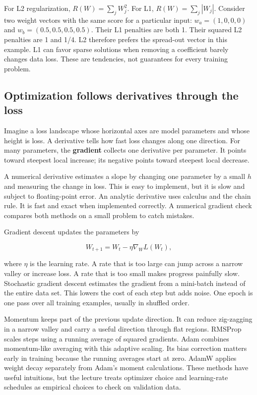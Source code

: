 For L2 regularization, \(R(W)=\sum_j W_j^2\). For L1, \(R(W)=\sum_j|W_j|\). Consider two weight vectors with the same score for a particular input: \(w_a=(1,0,0,0)\) and \(w_b=(0.5,0.5,0.5,0.5)\). Their L1 penalties are both 1. Their squared L2 penalties are 1 and 1/4. L2 therefore prefers the spread-out vector in this example. L1 can favor sparse solutions when removing a coefficient barely changes data loss. These are tendencies, not guarantees for every training problem.

\subsection{Optimization follows derivatives through the loss}\label{04-visual-computing-ii-ch031-optimization-follows-derivatives-through-the-loss}

Imagine a loss landscape whose horizontal axes are model parameters and whose height is loss. A derivative tells how fast loss changes along one direction. For many parameters, the \textbf{gradient} collects one derivative per parameter. It points toward steepest local increase; its negative points toward steepest local decrease.

A numerical derivative estimates a slope by changing one parameter by a small \(h\) and measuring the change in loss. This is easy to implement, but it is slow and subject to floating-point error. An analytic derivative uses calculus and the chain rule. It is fast and exact when implemented correctly. A numerical gradient check compares both methods on a small problem to catch mistakes.

Gradient descent updates the parameters by

\[W_{t+1}=W_t-\eta\nabla_W L(W_t),\]

where \(\eta\) is the learning rate. A rate that is too large can jump across a narrow valley or increase loss. A rate that is too small makes progress painfully slow. Stochastic gradient descent estimates the gradient from a mini-batch instead of the entire data set. This lowers the cost of each step but adds noise. One epoch is one pass over all training examples, usually in shuffled order.

Momentum keeps part of the previous update direction. It can reduce zig-zagging in a narrow valley and carry a useful direction through flat regions. RMSProp scales steps using a running average of squared gradients. Adam combines momentum-like averaging with this adaptive scaling. Its bias correction matters early in training because the running averages start at zero. AdamW applies weight decay separately from Adam's moment calculations. These methods have useful intuitions, but the lecture treats optimizer choice and learning-rate schedules as empirical choices to check on validation data.

